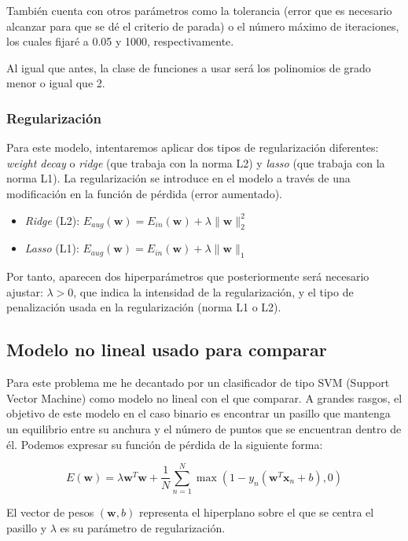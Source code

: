 \documentclass[10pt,a4paper]{article}
\begin{document}
También cuenta con otros parámetros como la tolerancia (error que es necesario alcanzar para que se dé el criterio de parada) o el número máximo de iteraciones, los cuales fijaré a 0.05 y 1000, respectivamente.

Al igual que antes, la clase de funciones a usar será los polinomios de grado menor o igual que 2.

\subsubsection{Regularización}

Para este modelo, intentaremos aplicar dos tipos de regularización diferentes: \textit{weight decay} o \textit{ridge} (que trabaja con la norma L2) y \textit{lasso} (que trabaja con la norma L1). La regularización se introduce en el modelo a través de una modificación en la función de pérdida (error aumentado).

\begin{itemize}
	\item \textit{Ridge} (L2): $E_{aug}(\textbf{w}) = E_{in}(\textbf{w}) + \lambda \|\textbf{w}\|_2^2$
	\item \textit{Lasso} (L1): $E_{aug}(\textbf{w}) = E_{in}(\textbf{w}) + \lambda \|\textbf{w}\|_1$
\end{itemize}

Por tanto, aparecen dos hiperparámetros que posteriormente será necesario ajustar: $\lambda>0$, que indica la intensidad de la regularización, y el tipo de penalización usada en la regularización (norma L1 o L2).


\subsection{Modelo no lineal usado para comparar}

Para este problema me he decantado por un clasificador de tipo SVM (Support Vector Machine) como modelo no lineal con el que comparar. A grandes rasgos, el objetivo de este modelo en el caso binario es encontrar un pasillo que mantenga un equilibrio entre su anchura y el número de puntos que se encuentran dentro de él. Podemos expresar su función de pérdida de la siguiente forma:

$$E(\textbf{w}) = \lambda \textbf{w}^T \textbf{w} + \frac{1}{N} \sum_{n=1}^{N} \max(1-y_n(\textbf{w}^T\textbf{x}_n+b),0)$$

El vector de pesos $(\textbf{w},b)$ representa el hiperplano sobre el que se centra el pasillo y $\lambda$ es su parámetro de regularización.
\end{document}
